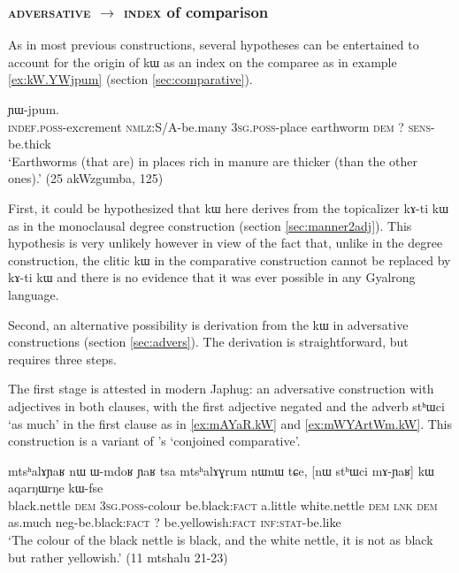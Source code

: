 \documentclass[oldfontcommands,oneside,a4paper,11pt]{article}
\newcommand{\ipa}[1]{{\phon #1}} %
\begin{document}
 
 
  \subsubsection{\textsc{adversative} $\rightarrow$ \textsc{index} of comparison}
  As in most previous constructions, several hypotheses can be entertained to account for the origin of \ipa{kɯ} as an index on the comparee as in example \ref{ex:kW.YWjpum}  (section \ref{sec:comparative}).
  
        \begin{exe}
  \ex  \label{ex:kW.YWjpum}  
  \gll 
  [\ipa{tɯ-ɣli} 	\ipa{kɯ-dɤn} 	\ipa{ɯ-stu} \ipa{qandʐe} 	\ipa{nɯ}] 	\ipa{kɯ} 	\ipa{ɲɯ-jpum.} \\
  \textsc{indef.poss}-excrement \textsc{nmlz}:S/A-be.many \textsc{3sg.poss}-place earthworm \textsc{dem} ?{ } \textsc{sens}-be.thick   \\
  \glt `Earthworms (that are) in places rich in manure are thicker (than the other ones).'
   (25 akWzgumba, 125)
   \end{exe} 

  First, it could be hypothesized that \ipa{kɯ} here derives from the topicalizer \ipa{kɤ-ti kɯ}  as in the monoclausal degree construction (section \ref{sec:manner2adj}). This hypothesis is very unlikely however in view of the fact that, unlike in the degree construction, the clitic \ipa{kɯ} in the comparative construction cannot be replaced by \ipa{kɤ-ti kɯ} and there is no evidence that it was ever  possible in any Gyalrong language.
  
  
Second, an alternative possibility is derivation from the \ipa{kɯ} in adversative constructions (section \ref{sec:advers}). The derivation is straightforward, but requires three steps.

The first stage is attested in modern Japhug: an adversative construction with adjectives in both  clauses, with the first adjective negated and the adverb \ipa{stʰɯci} `as much' in the first clause as in \ref{ex:mAYaR.kW} and \ref{ex:mWYArtWm.kW}.  This construction is a variant of \citet{stassen11comparative}'s `conjoined comparative'.

        \begin{exe}
  \ex  \label{ex:mAYaR.kW}  
  \gll 
  \ipa{mtsʰalɤɲaʁ} 	\ipa{nɯ} 	\ipa{ɯ-mdoʁ} 	\ipa{ɲaʁ} 	\ipa{tsa} 	\ipa{mtsʰalɤɣrum} 	\ipa{nɯnɯ} 	\ipa{tɕe,} 	[\ipa{nɯ} \ipa{stʰɯci} 	\ipa{mɤ-ɲaʁ}] 	\ipa{kɯ}   	\ipa{aqarŋɯrŋe} 	\ipa{kɯ-fse} 	\\
  black.nettle \textsc{dem} \textsc{3sg.poss}-colour be.black:\textsc{fact} a.little   white.nettle \textsc{dem} \textsc{lnk} \textsc{dem} as.much neg-be.black:\textsc{fact}  ?{ } be.yellowish:\textsc{fact} \textsc{inf:stat}-be.like \\
  \glt `The colour of the black nettle is black, and the white nettle, it is not as  black but rather yellowish.'   (11 mtshalu 21-23)
        \end{exe}
        
\end{document}
